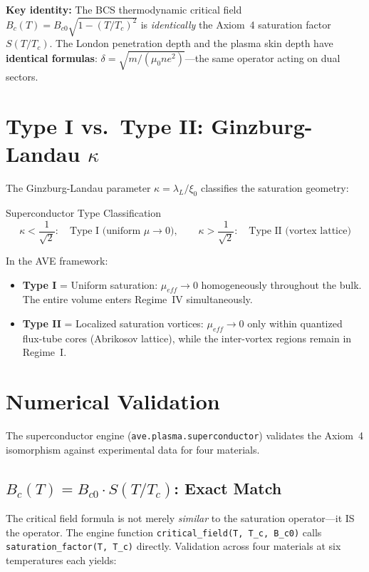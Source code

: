 \textbf{Key identity:} The BCS thermodynamic critical field $B_c(T) = B_{c0}\sqrt{1-(T/T_c)^2}$ is \textit{identically} the Axiom~4 saturation factor $S(T/T_c)$.  The London penetration depth and the plasma skin depth have \textbf{identical formulas}: $\delta = \sqrt{m/({\mu_0 n e^2})}$---the same operator acting on dual sectors.

\section{Type I vs.\ Type II: Ginzburg-Landau $\kappa$}
\label{sec:type_classification}

The Ginzburg-Landau parameter $\kappa = \lambda_L / \xi_0$ classifies the saturation geometry:
\begin{resultbox}{Superconductor Type Classification}
\begin{equation}
    \kappa < \frac{1}{\sqrt{2}}: \quad \text{Type I (uniform } \mu \to 0\text{)}, \qquad
    \kappa > \frac{1}{\sqrt{2}}: \quad \text{Type II (vortex lattice)}
\end{equation}
\end{resultbox}

In the AVE framework:
\begin{itemize}
    \item \textbf{Type I} = Uniform saturation: $\mu_{eff} \to 0$ homogeneously throughout the bulk.  The entire volume enters Regime~IV simultaneously.
    \item \textbf{Type II} = Localized saturation vortices: $\mu_{eff} \to 0$ only within quantized flux-tube cores (Abrikosov lattice), while the inter-vortex regions remain in Regime~I.
\end{itemize}

\section{Numerical Validation}
\label{sec:superconductor_validation}

The superconductor engine (\texttt{ave.plasma.superconductor}) validates
the Axiom~4 isomorphism against experimental data for four materials.

\subsection{$B_c(T) = B_{c0} \cdot S(T/T_c)$: Exact Match}

The critical field formula is not merely \textit{similar} to the saturation operator---it
IS the operator.  The engine function \texttt{critical\_field(T, T\_c, B\_c0)} calls
\texttt{saturation\_factor(T, T\_c)} directly.  Validation across four materials
at six temperatures each yields:

